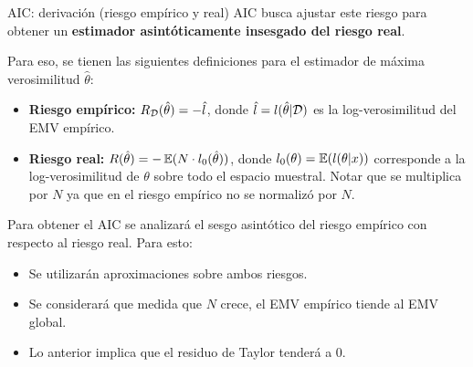 \documentclass[handout, 9pt]{beamer}
\begin{document}
\begin{frame}{AIC: derivación (riesgo empírico y real)}
	AIC busca ajustar este riesgo para obtener un \textbf{estimador asintóticamente insesgado del riesgo real}.\\ \pause
	
Para eso, se tienen las siguientes definiciones para el estimador de máxima verosimilitud $\hat{\theta}$:

\begin{itemize}
	\item \textbf{Riesgo empírico:} $R_{\mathcal D}(\hat{\theta})=-\hat{l}$, donde $\hat{l}=l(\hat{\theta}|{\mathcal D})$ es la log-verosimilitud del EMV empírico. \pause
	\item \textbf{Riesgo real:} $R(\hat{\theta})=-\operatorname{\mathbb{E}}(N\cdot l_0(\hat{\theta}))$, donde $l_0(\theta)=\operatorname{\mathbb{E}}(l(\theta|x))$ corresponde a la log-verosimilitud de $\theta$ sobre todo el espacio muestral. Notar que se multiplica por $N$ ya que en el riesgo empírico no se normalizó por $N$. \pause
\end{itemize}

Para obtener el AIC se analizará el sesgo asintótico del riesgo empírico con respecto al riesgo real. Para esto:

\begin{itemize}
	\item Se utilizarán aproximaciones sobre ambos riesgos. \pause
	\item Se considerará que medida que $N$ crece, el EMV empírico tiende al EMV global. \pause
	\item Lo anterior implica que el residuo de Taylor tenderá a 0.
\end{itemize}

\end{frame}
\end{document}
